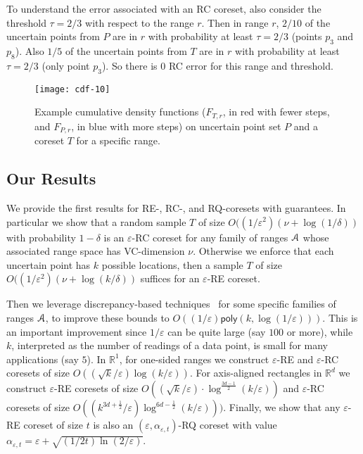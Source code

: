 \documentclass[11pt]{myclass}
\newcommand{\eps}{\varepsilon}
\newcommand{\Eu}[1]{\ensuremath{\EuScript{#1}}}
\newcommand{\bl}[1]{\ensuremath{\mathbb{#1}}}
\newcommand{\RC}{\textsf{RC}\xspace}
\newcommand{\RE}{\textsf{RE}\xspace}
\newcommand{\RQ}{\textsf{RQ}\xspace}
\begin{document}
To understand the error associated with an \RC coreset, also consider the threshold $\tau = 2/3$ with respect to the range $r$.  Then in range $r$, $2/10$ of the uncertain points from $P$ are in $r$ with probability at least $\tau = 2/3$ (points $p_3$ and $p_8$).  Also $1/5$ of the uncertain points from $T$ are in $r$ with probability at least $\tau = 2/3$ (only point $p_3$).  So there is $0$ \RC error for this range and threshold.  


\begin{figure}[t]
\centering
\texttt{[image: cdf-10]}
\caption{Example cumulative density functions  ($F_{T,r}$, in red with fewer steps, and $F_{P,r}$, in blue with more steps) on uncertain point set $P$ and a coreset $T$ for a specific range.}
\label{fig:cdf-10}
\end{figure}

\subsection{Our Results}

We provide the first results for \RE-, \RC-, and \RQ-coresets with guarantees.  In particular we show that a random sample $T$ of size $O((1/\eps^2) (\nu + \log(1/\delta))$ with probability $1-\delta$ is an $\eps$-\RC coreset for any family of ranges $\Eu{A}$ whose associated range space has VC-dimension $\nu$.  
Otherwise we enforce that each uncertain point has $k$ possible locations, then a sample $T$ of size $O((1/\eps^2) (\nu + \log(k/\delta))$ suffices for an $\eps$-\RE coreset.  

Then we leverage discrepancy-based techniques~\cite{Mat99,Cha01} for some specific families of ranges $\Eu{A}$, to improve these bounds to $O((1/\eps) \textsf{poly}(k, \log(1/\eps)))$.  This is an important improvement since $1/\eps$ can be quite large (say $100$ or more), while $k$, interpreted as the number of readings of a data point, is small for many applications (say $5$).  
In $\bl{R}^1$, for one-sided ranges we construct $\eps$-\RE and $\eps$-\RC coresets of size $O((\sqrt{k}/\eps) \log(k/\eps))$.
For axis-aligned rectangles in $\bl{R}^d$ we construct $\eps$-\RE coresets of size $O((\sqrt{k}/\eps) \cdot \log^{\frac{3d-1}{2}} (k/\eps))$ and $\eps$-\RC coresets of size $O((k^{3d+ \frac{1}{2}}/\eps) \log^{6d-\frac{1}{2}} (k/\eps)))$.  
Finally, we show that any $\eps$-\RE coreset of size $t$ is also an $(\eps,\alpha_{\eps,t})$-\RQ coreset with value $\alpha_{\eps,t} = \eps + \sqrt{(1/2t)\ln(2/\eps)}$.  
\end{document}
